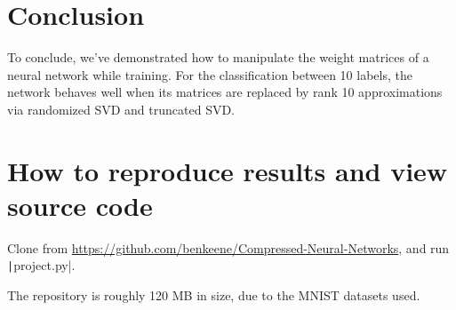 \documentclass{article}
\begin{document}
\section{Conclusion}

To conclude, we've demonstrated how to manipulate the weight matrices of a neural network while training.
For the classification between 10 labels, the network behaves well when its matrices are replaced by rank 10 approximations via randomized SVD and truncated SVD.

\section{How to reproduce results and view source code}

Clone from \url{https://github.com/benkeene/Compressed-Neural-Networks}, and run \texttt|project.py|.

\bigskip

The repository is roughly 120 MB in size, due to the MNIST datasets used.
\end{document}
